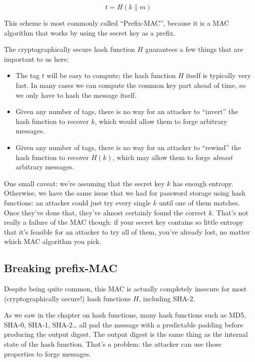 \documentclass[11pt,ebook,table,dvipsnames]{memoir}
\begin{document}
\[
t = H(k \| m)
\]

This scheme is most commonly called \enquote{Prefix-MAC}, because it is a MAC
algorithm that works by using the secret key as a prefix.

The cryptographically secure hash function $H$ guarantees a few things
that are important to us here:

\begin{itemize}
\item The tag $t$ will be easy to compute; the hash function $H$ itself
is typically very fast. In many cases we can compute the common
key part ahead of time, so we only have to hash the message itself.
\item Given any number of tags, there is no way for an attacker to
\enquote{invert} the hash function to recover $k$, which would allow them
to forge arbitrary messages.
\item Given any number of tags, there is no way for an attacker to
\enquote{rewind} the hash function to recover $H(k)$, which may allow them
to forge \emph{almost} arbitrary messages.
\end{itemize}

One small caveat: we're assuming that the secret key $k$ has enough
entropy. Otherwise, we have the same issue that we had for password
storage using hash functions: an attacker could just try every single
$k$ until one of them matches. Once they've done that, they've almost
certainly found the correct $k$. That's not really a failure of the
MAC though: if your secret key contains so little entropy that it's
feasible for an attacker to try all of them, you've already lost, no
matter which MAC algorithm you pick.

\subsection{Breaking prefix-MAC}
\label{sec-2-7-3-1}

Despite being quite common, this MAC is actually completely insecure
for most (cryptographically secure!) hash functions $H$, including
SHA-2.

As we saw in the chapter on hash functions, many hash functions such
as MD5, SHA-0, SHA-1, SHA-2\ldots{} all pad the message with a predictable
padding before producing the output digest. The output digest is the
same thing as the internal state of the hash function. That's a
problem: the attacker can use those properties to forge messages.
\end{document}
